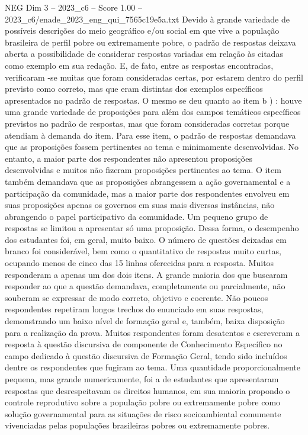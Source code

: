 \begin{textsample}{NEG Dim 3 – 2023\_c6 – Score 1.00 – 2023\_c6/enade\_2023\_eng\_qui\_7565c19e5a.txt}
Devido à grande variedade de possíveis descrições do meio geográfico e/ou social em que vive a população brasileira de perfil pobre ou extremamente pobre, o padrão de respostas deixava aberta a possibilidade de considerar respostas variadas em relação às citadas como exemplo em sua redação.
E, de fato, entre as respostas encontradas, verificaram -se muitas que foram consideradas certas, por estarem dentro do perfil previsto como correto, mas que eram distintas dos exemplos específicos apresentados no padrão de respostas.
O mesmo se deu quanto ao item b ) : houve uma grande variedade de proposições para além dos campos temáticos específicos previstos no padrão de respostas, mas que foram consideradas corretas porque atendiam à demanda do item.
Para esse item, o padrão de respostas demandava que as proposições fossem pertinentes ao tema e minimamente desenvolvidas.
No entanto, a maior parte dos respondentes não apresentou proposições desenvolvidas e muitos não fizeram proposições pertinentes ao tema.
O item também demandava que as proposições abrangessem a ação governamental e a participação da comunidade, mas a maior parte dos respondentes envolveu em suas proposições apenas os governos em suas mais diversas instâncias, não abrangendo o papel participativo da comunidade.
Um pequeno grupo de respostas se limitou a apresentar só uma proposição.
Dessa forma, o desempenho dos estudantes foi, em geral, muito baixo.
O número de questões deixadas em branco foi considerável, bem como o quantitativo de respostas muito curtas, ocupando menos de cinco das 15 linhas oferecidas para a resposta.
Muitos responderam a apenas um dos dois itens.
A grande maioria dos que buscaram responder ao que a questão demandava, completamente ou parcialmente, não souberam se expressar de modo correto, objetivo e coerente.
Não poucos respondentes repetiram longos trechos do enunciado em suas respostas, demonstrando um baixo nível de formação geral e, também, baixa disposição para a realização da prova.
Muitos respondentes foram desatentos e escreveram a resposta à questão discursiva de componente de Conhecimento Específico no campo dedicado à questão discursiva de Formação Geral, tendo sido incluídos dentre os respondentes que fugiram ao tema.
Uma quantidade proporcionalmente pequena, mas grande numericamente, foi a de estudantes que apresentaram respostas que desrespeitavam os direitos humanos, em sua maioria propondo o controle reprodutivo sobre a população pobre ou extremamente pobre como solução governamental para as situações de risco socioambiental comumente vivenciadas pelas populações brasileiras pobres ou extremamente pobres.

\end{textsample}
